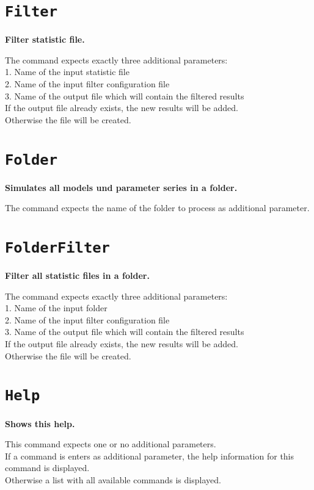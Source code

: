 \section{\texttt{Filter}}

\textbf{Filter statistic file.}

The command expects exactly three additional parameters:\\
1. Name of the input statistic file\\
2. Name of the input filter configuration file\\
3. Name of the output file which will contain the filtered results\\
If the output file already exists, the new results will be added.\\
Otherwise the file will be created.

\section{\texttt{Folder}}

\textbf{Simulates all models und parameter series in a folder.}

The command expects the name of the folder to process as additional parameter.

\section{\texttt{FolderFilter}}

\textbf{Filter all statistic files in a folder.}

The command expects exactly three additional parameters:\\
1. Name of the input folder\\
2. Name of the input filter configuration file\\
3. Name of the output file which will contain the filtered results\\
If the output file already exists, the new results will be added.\\
Otherwise the file will be created.

\section{\texttt{Help}}

\textbf{Shows this help.}

This command expects one or no additional parameters.\\
If a command is enters as additional parameter, the help information for this command is displayed.\\
Otherwise a list with all available commands is displayed.

